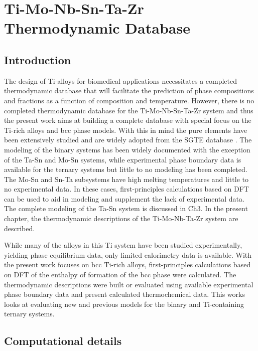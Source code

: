 \chapter{Ti-Mo-Nb-Sn-Ta-Zr Thermodynamic Database}

\section{Introduction}

The design of Ti-alloys for biomedical applications necessitates a completed thermodynamic database that will facilitate the prediction of phase compositions and fractions as a function of composition and temperature. However, there is no completed thermodynamic database for the Ti-Mo-Nb-Sn-Ta-Zr system and thus the present work aims at building a complete database with special focus on the Ti-rich alloys and bcc phase models. With this in mind the pure elements have been extensively studied and are widely adopted from the SGTE database \cite{Dinsdale1991}. The modeling of the binary systems has been widely documented with the exception of the Ta-Sn and Mo-Sn systems, while experimental phase boundary data is available for the ternary systems but little to no modeling has been completed. The Mo-Sn and Sn-Ta subsystems have high melting temperatures and little to no experimental data. In these cases, first-principles calculations based on DFT can be used to aid in modeling and supplement the lack of experimental data. The complete modeling of the Ta-Sn system is discussed in Ch3. In the present chapter, the thermodynamic descriptions of the Ti-Mo-Nb-Ta-Zr system are described. 

While many of the alloys in this Ti system have been studied experimentally, yielding phase equilibrium data, only limited calorimetry data is available. With the present work focuses on bcc Ti-rich alloys, first-principles calculations based on DFT of the enthalpy of formation of the bcc phase were calculated. The thermodynamic descriptions were built or evaluated using available experimental phase boundary data and present calculated thermochemical data. This works looks at evaluating new and previous models for the binary and Ti-containing ternary systems. 

\section{Computational details}

